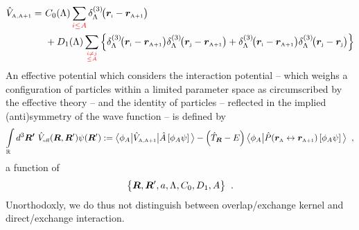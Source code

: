\documentclass[aps,prd,onecolumn
,tightenlines,letterpaper,
notitlepage,11pt,linenumbers,
nofootinbib]{revtex4-1}
\begin{document}
\begin{align}
\hat{V}_\text{\tiny A,A+1}=&~C_0(\Lambda)\sum\limits_{\red{i\leq A}}\ddrei{\vsp{i}-\vsp{A+1}}\la{eq.v2}\\
&~+D_1(\Lambda)\sum\limits_{\red{i\neq j\atop \leq A}}\left\lbrace\ddrei{\vsp{i}-\vsp{A+1}}\ddrei{\vsp{j}-\vsp{A+1}}+\ddrei{\vsp{i}-\vsp{A+1}}\ddrei{\vsp{j}-\vsp{j}}\right\rbrace\la{eq.v3}
\end{align}
An effective potential which considers the
interaction potential -- which weighs a configuration of particles within a limited
parameter space as circumscribed by the effective theory -- and the
identity of particles -- reflected in the implied (anti)symmetry of the
wave function -- is defined by
\begin{gather}
\int\limits_{\mathbb{R}}d^3\boldsymbol{R'}~\hat{V}_\text{\tiny eff}(\boldsymbol{R},\boldsymbol{R}')\psi(\boldsymbol{R}')
:=
\big\langle\phi_A\big\vert\hat{V}_\text{\tiny A,A+1}\big\vert\hat{A}\left[\phi_A\psi\right]\big\rangle-\left(\hat{T}_{\boldsymbol{R}}-E\right)\big\langle\phi_A\big\vert\hat{P}(\boldsymbol{r}_\text{\tiny A}\leftrightarrow\boldsymbol{r}_\text{\tiny A+1})\left[\phi_A\psi\right]\big\rangle\;\;,
\end{gather}
a function of
$$ \big\lbrace\boldsymbol{R},\boldsymbol{R}',a,\Lambda,C_0,D_1,A\big\rbrace\;\;. $$
Unorthodoxly, we do thus not distinguish between overlap/exchange kernel and direct/exchange interaction.
\end{document}
